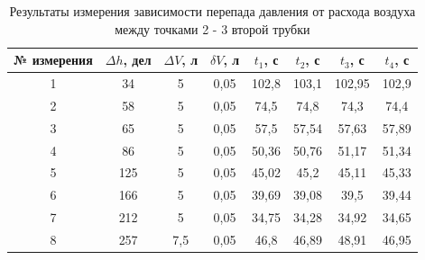 \documentclass[11pt,a4paper]{article}
\begin{document}
\begin{enumerate}
\begin{table}[h!]
\centering
\begin{tabular}{|c|c|c|c|c|c|c|c|}
\hline
№ измерения & $\Delta h$, дел & $\Delta V$, л & $\delta V$, л & $t_{1}$, с & $t_{2}$, с & $t_{3}$, с & $t_{4}$, с \\ \hline
1           & 34              & 5             & 0,05          & 102,8      & 103,1      & 102,95     & 102,9      \\ \hline
2           & 58              & 5             & 0,05          & 74,5       & 74,8       & 74,3       & 74,4       \\ \hline
3           & 65              & 5             & 0,05          & 57,5       & 57,54      & 57,63      & 57,89      \\ \hline
4           & 86              & 5             & 0,05          & 50,36      & 50,76      & 51,17      & 51,34      \\ \hline
5           & 125             & 5             & 0,05          & 45,02      & 45,2       & 45,11      & 45,33      \\ \hline
6           & 166             & 5             & 0,05          & 39,69      & 39,08      & 39,5       & 39,44      \\ \hline
7           & 212             & 5             & 0,05          & 34,75      & 34,28      & 34,92      & 34,65      \\ \hline
8           & 257             & 7,5           & 0,05          & 46,8       & 46,89      & 48,91      & 46,95      \\ \hline
\end{tabular}
\caption{Результаты измерения зависимости перепада давления от расхода воздуха между точками 2 - 3 второй трубки}
\label{tab:flow_measuring_2_3_second_tube}
\end{table}


\end{enumerate}
\end{document}
